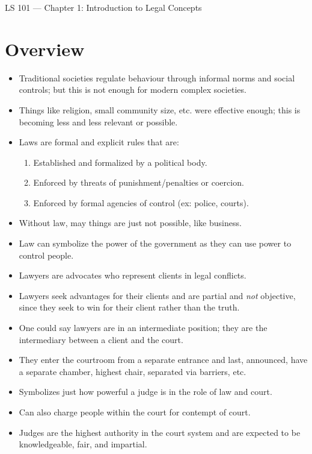 \documentclass{article}
\author{Clement Tsang}
\begin{document}
\begin{center}
    \Large{LS 101 --- Chapter 1: Introduction to Legal Concepts}
\end{center}

\section{Overview}
\begin{itemize}
    \item Traditional societies regulate behaviour through informal norms and social controls; but this is not enough for modern complex societies.
    \item Things like religion, small community size, etc. were effective enough; this is becoming less and less relevant or possible.
    \item Laws are formal and explicit rules that are:
        \begin{enumerate}
            \item Established and formalized by a political body.
            \item Enforced by threats of punishment/penalties or coercion.
            \item Enforced by formal agencies of control (ex: police, courts).
        \end{enumerate}
    \item Without law, may things are just not possible, like business.
    \item Law can symbolize the power of the government as they can use power to control people.
    \item Lawyers are advocates who represent clients in legal conflicts.
    \item Lawyers seek advantages for their clients and are partial and \emph{not} objective, since they seek to win for their client rather than the truth.
    \item One could say lawyers are in an intermediate position; they are the intermediary between a client and the court.
    \item They enter the courtroom from a separate entrance and last, announced, have a separate chamber, highest chair, separated via barriers, etc.
    \item Symbolizes just how powerful a judge is in the role of law and court.
    \item Can also charge people within the court for contempt of court.
    \item Judges are the highest authority in the court system and are expected to be knowledgeable, fair, and impartial.
\end{itemize}
\end{document}
